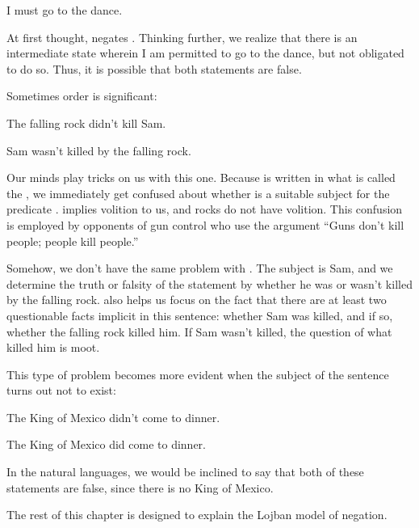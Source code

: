 \begin{example}
I must go to the dance.
\end{example}

At first thought,  negates . Thinking further, we realize that
    there is an intermediate state wherein I am permitted to go to
    the dance, but not obligated to do so. Thus, it is possible
    that both statements are false.

Sometimes order is significant:
\begin{example}
The falling rock didn't kill Sam.
\end{example}

\begin{example}
Sam wasn't killed by the falling rock.
\end{example}

Our minds play tricks on us with this one. Because  is written in what is called the
    , we immediately get confused about whether
     is a suitable subject for the predicate
    .  implies volition to us, and rocks do
    not have volition. This confusion is employed by opponents of
    gun control who use the argument ``Guns don't kill people;
    people kill people.''

Somehow, we don't have the same problem with . The subject is Sam, and we
    determine the truth or falsity of the statement by whether he
    was or wasn't killed by the falling rock.
 also helps us focus on the
    fact that there are at least two questionable facts implicit in
    this sentence: whether Sam was killed, and if so, whether the
    falling rock killed him. If Sam wasn't killed, the question of
    what killed him is moot.

This type of problem becomes more evident when the subject
    of the sentence turns out not to exist:
\begin{example}
The King of Mexico didn't come to dinner.
\end{example}

\begin{example}
The King of Mexico did come to dinner.
\end{example}

In the natural languages, we would be inclined to say that
    both of these statements are false, since there is no King of
    Mexico.

The rest of this chapter is designed to explain the Lojban
    model of negation.



